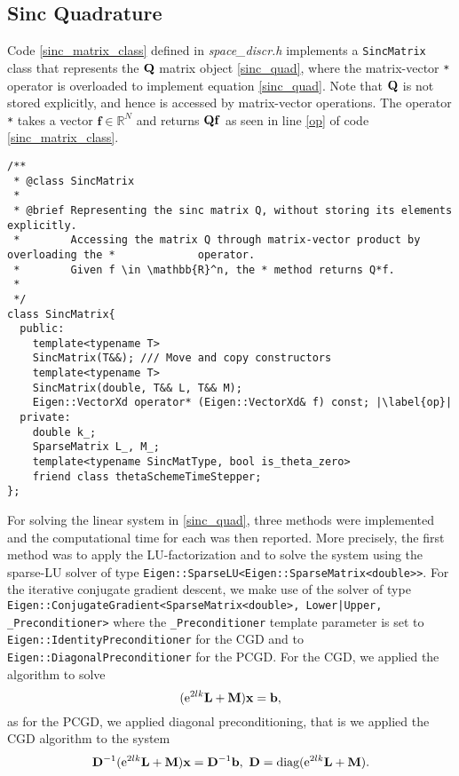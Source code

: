 \subsection{Sinc Quadrature}
Code \ref{sinc_matrix_class} defined in \textit{space\_discr.h} implements a \lstinline{SincMatrix} class that represents the $\mathbf{Q}$ matrix object \eqref{sinc_quad}, where the matrix-vector \lstinline{*} operator is overloaded to implement equation \eqref{sinc_quad}. Note that $\mathbf{Q}$ is not stored explicitly, and hence is accessed by matrix-vector operations. The operator \lstinline{*} takes a vector $\mathbf{f} \in \mathbb{R}^N$ and returns $\mathbf{Q}\mathbf{f}$ as seen in line \eqref{op} of code \eqref{sinc_matrix_class}. 
\begin{lstlisting}[caption={$\sinc$ matrix class.}, label={sinc_matrix_class}, escapechar=|]
/**
 * @class SincMatrix
 *
 * @brief Representing the sinc matrix Q, without storing its elements explicitly.
 *        Accessing the matrix Q through matrix-vector product by overloading the * 	        operator.
 *        Given f \in \mathbb{R}^n, the * method returns Q*f.
 *
 */
class SincMatrix{
  public:
    template<typename T> 
    SincMatrix(T&&); /// Move and copy constructors 
    template<typename T> 
    SincMatrix(double, T&& L, T&& M); 
    Eigen::VectorXd operator* (Eigen::VectorXd& f) const; |\label{op}|
  private:
    double k_; 
    SparseMatrix L_, M_;
    template<typename SincMatType, bool is_theta_zero>
    friend class thetaSchemeTimeStepper; 
};
\end{lstlisting}
For solving the linear system in \eqref{sinc_quad}, three methods were implemented and the computational time for each was then reported. More precisely, the first method was to apply the LU-factorization and to solve the system using the sparse-LU solver of type \lstinline{Eigen::SparseLU<Eigen::SparseMatrix<double>>}. For the iterative conjugate gradient descent, we make use of the solver of type \lstinline{Eigen::ConjugateGradient<SparseMatrix<double>, Lower|Upper, _Preconditioner>} where the \lstinline{_Preconditioner} template parameter is set to \lstinline{Eigen::IdentityPreconditioner} for the CGD and to \lstinline{Eigen::DiagonalPreconditioner} for the PCGD.
For the CGD, we applied the algorithm to solve 
\begin{equation*}
(\text{e}^{2lk}\mathbf{L}+\mathbf{M})\mathbf{x} = \mathbf{b},
\end{equation*}
as for the PCGD, we applied diagonal preconditioning, that is we applied the CGD algorithm to the system
\begin{equation*}
\mathbf{D}^{-1}(\text{e}^{2lk}\mathbf{L}+\mathbf{M})\mathbf{x} = \mathbf{D}^{-1}\mathbf{b}, \  \mathbf{D} = \text{diag}(\text{e}^{2lk}\mathbf{L}+\mathbf{M}). 
\end{equation*}

